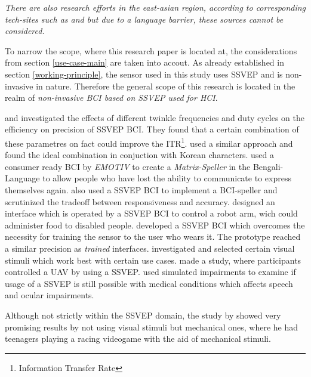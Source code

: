             \medskip

            \emph{There are also research efforts in the east-asian region, according to corresponding tech-sites such as \cite{GlobalTimes.20042021} and \cite{TechwireAsia.24052021} but due to a language barrier, these sources cannot be considered.}

            \medskip

            To narrow the scope, where this research paper is located at, the considerations from section \ref*{use-case-main} are taken into accout. As already established in section \ref*{working-principle}, the sensor used in this study uses SSVEP and is non-invasive in nature. Therefore the general scope of this research is located in the realm of \textit{non-invasive BCI based on SSVEP used for HCI}.

            \medskip

            \cite{Oralhan.2016} and \cite{Resalat.2011} investigated the effects of different twinkle frequencies and duty cycles on the efficiency on precision of SSVEP BCI. They found that a certain combination of these parametres on fact could improve the ITR\footnote{Information Transfer Rate}. \cite{Lee.2016} used a similar approach and found the ideal combination in conjuction with Korean characters.
            \cite{S.M.Abdullah.2014} used a consumer ready BCI by \textit{EMOTIV} to create a \textit{Matrix-Speller} in the Bengali-Language to allow people who have lost the ability to communicate to express themselves again. 
            \cite{Chen.2020} also used a SSVEP BCI to implement a BCI-speller and scrutinized the tradeoff between responsiveness and accuracy.
            \cite{Chen.2020} designed an interface which is operated by a SSVEP BCI to control a robot arm, wich could administer food to disabled people.
            \cite{Soroush.2018} developed a SSVEP BCI which overcomes the necessity for training the sensor to the user who wears it. The prototype reached a similar precision as \textit{trained} interfaces.
            \cite{Gergondet.2015} investigated and selected certain visual stimuli which work best with certain use cases.
            \cite{Merino.2017} made a study, where participants controlled a UAV by using a SSVEP.
            \cite{Peters.2018} used simulated impairments to examine if usage of a SSVEP is still possible with medical conditions which affects speech and ocular impairments.

            Although not strictly within the SSVEP domain, the study by \cite{Beveridge.2017} showed very promising results by not using visual stimuli but mechanical ones, where he had teenagers playing a racing videogame with the aid of mechanical stimuli.

